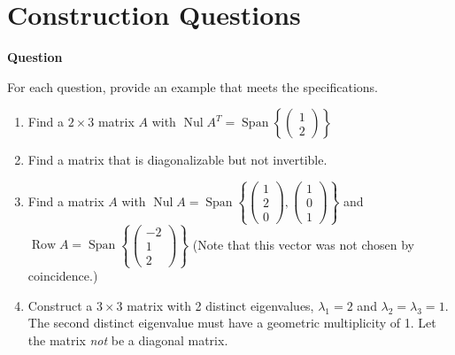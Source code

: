 \documentclass[10pt, titlepage]{article}
\newcounter{question}
\newenvironment{newquestion}
{
	\noindent\textbf{Question \thequestion}
}
{
\stepcounter{question}
\par
}
\DeclareMathOperator{\vspan}{Span}
\DeclareMathOperator{\rowspace}{Row}
\DeclareMathOperator{\nullspace}{Nul}
\begin{document}
\section{\centering Construction Questions}
	\begin{newquestion}
		For each question, provide an example that meets the specifications.
		\begin{enumerate}
			\item Find a \(2 \times 3\) matrix \(A\) with \(\nullspace A^T = \vspan \left\{\!\! \begin{pmatrix}1 \\ 2\end{pmatrix}\!\!\right\}\)
			\item Find a matrix that is diagonalizable but not invertible.
			\item Find a matrix \(A\) with \(\nullspace A = \vspan\left\{\!\!\begin{pmatrix}1 \\ 2 \\ 0\end{pmatrix}, \begin{pmatrix}1 \\ 0 \\ 1\end{pmatrix}\!\!\right\}\) and \(\rowspace A = \vspan\left\{\!\!\begin{pmatrix}-2 \\ 1 \\ 2\end{pmatrix}\!\!\right\}\) (Note that this vector was not chosen by coincidence.)
			\item Construct a \(3 \times 3\) matrix with 2 distinct eigenvalues, \(\lambda_1 = 2\) and \(\lambda_2 = \lambda_3 = 1\). The second distinct
			eigenvalue must have a geometric multiplicity of 1. Let the matrix \emph{not} be a diagonal matrix. 
		\end{enumerate}
	\end{newquestion}
\end{document}
